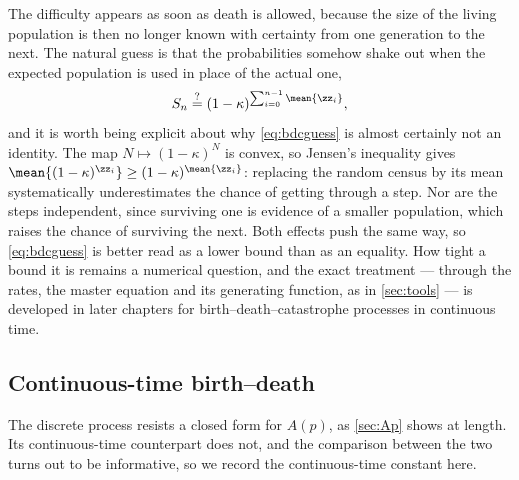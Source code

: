 The difficulty appears as soon as death is allowed, because the size of the living
population is then no longer known with certainty from one generation to the next. The
natural guess is that the probabilities somehow shake out when the expected population is
used in place of the actual one,
\begin{equation}
\label{eq:bdcguess}
S_n \overset{?}{=} (1-\kappa)^{\sum_{i=0}^{n-1}\mean{\zz_i}} ,
\end{equation}
and it is worth being explicit about why \cref{eq:bdcguess} is almost certainly not an
identity. The map $N\mapsto(1-\kappa)^N$ is convex, so Jensen's inequality gives
$\mean{(1-\kappa)^{\zz_i}}\ge(1-\kappa)^{\mean{\zz_i}}$: replacing the random census by
its mean systematically underestimates the chance of getting through a step. Nor are the
steps independent, since surviving one is evidence of a smaller population, which raises
the chance of surviving the next. Both effects push the same way, so \cref{eq:bdcguess}
is better read as a lower bound than as an equality. How tight a bound it is remains a
numerical question, and the exact treatment --- through the rates, the master equation
and its generating function, as in \cref{sec:tools} --- is developed in later chapters for
birth--death--catastrophe processes in continuous time.

\subsection{Continuous-time birth--death}
\label{sec:cts}

The discrete process resists a closed form for $A(p)$, as \cref{sec:Ap} shows at length.
Its continuous-time counterpart does not, and the comparison between the two turns out to
be informative, so we record the continuous-time constant here.

